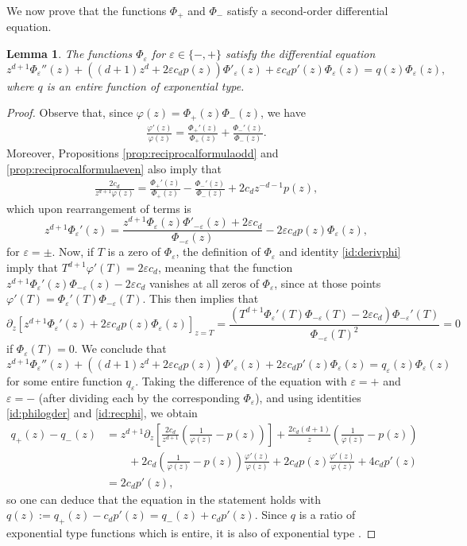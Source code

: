 \documentclass[a4paper,reqno,12pt]{amsart}
\newtheorem{lemma}[theorem]{Lemma}
\renewcommand{\P}{\Phi}
\newcommand{\ep}{\varepsilon}
\newcommand{\p}{\varphi}
\begin{document}
We now prove that the functions $\P_{+}$ and $\P_{-}$ satisfy a second-order differential equation.

\begin{lemma}\label{lem:ode-bigP}
The functions $\P_\ep$ for $\ep \in \{- ,+\}$ satisfy the differential equation
$$
z^{d+1}\P_\ep''(z) + ((d+1)z^d+2\ep c_d p(z))\P'_\ep(z) + \ep c_d p'(z) \P_\ep(z) = q(z) \P_\ep(z),
$$
where $q$ is an entire function of exponential type.
\end{lemma}
\begin{proof}
Observe that, since $\p(z)=\Phi_+(z)\Phi_-(z)$, we have 
\begin{align}\label{id:philogder}
\frac{\p'(z)}{\p(z)}=\frac{\P_+'(z)}{\P_+(z)}+\frac{\P_-'(z)}{\P_-(z)}.
\end{align}
Moreover, Propositions \ref{prop:reciprocalformulaodd} and \ref{prop:reciprocalformulaeven} also imply that
\begin{align}\label{id:recphi}
   \frac{2c_d}{z^{d+1}\p(z)} = \frac{\P_+'(z)}{\P_+(z)}-\frac{\P_-'(z)}{\P_-(z)} +2c_d z^{-d-1}p(z),
\end{align}
which upon rearrangement of terms is
$$
z^{d+1}\P_\ep'(z) = \frac{z^{d+1}\P_\ep(z)\P'_{-\ep}(z) +2\ep c_d}{\P_{-\ep}(z)} -2\ep c_d p(z)\P_\ep(z),
$$
for $\ep=\pm $. Now, if $T$ is a zero of $\P_\ep$, the definition of $\P_\ep$ and identity \eqref{id:derivphi} imply that $T^{d+1} \p'(T) = 2 \ep c_d$, meaning that the function $z^{d+1} \P_\ep'(z)\P_{-\ep}(z)-2\ep c_d$ vanishes at all zeros of $\P_\ep$, since at those points $\p'(T)  = \P_\ep'(T )\P_{-\ep} (T)$. This then implies that
$$
\partial_z [z^{d+1}\P_\ep'(z) + 2 \ep c_d p(z) \P_\ep(z)]_{z=T} = \frac{(T^{d+1}\P_\ep'(T)\P_{-\ep}(T) -2\ep c_d)\P_{-\ep}'(T)}{\P_{-\ep}(T)^2} = 0
$$
if $\P_\ep(T)=0$. We conclude that
$$
z^{d+1}\P_\ep''(z) + ((d+1)z^d+2\ep c_d p(z))\P'_\ep(z) + 2\ep c_d p'(z) \P_\ep(z) = q_\ep(z) \P_\ep(z)
$$
for some entire function $q_\ep$. Taking the difference of the equation with $\ep=+$ and $\ep=-$ (after dividing each by the corresponding $\P_\ep$), and using identities \eqref{id:philogder} and \eqref{id:recphi}, we obtain 
\begin{align*}
q_+(z)-q_-(z)&=
z^{d+1}\partial_z\left[
\frac{2c_d}{z^{d+1}}
\left(\frac{1}{\varphi(z)}-p(z)\right)\right]
+\frac{2c_d(d+1)}{z}\left(\frac{1}{\varphi(z)}-p(z)\right) \\
&\qquad+2c_d\left(\frac{1}{\varphi(z)}-p(z)\right)\frac{\varphi'(z)}{\varphi(z)}
+2c_d p(z)\frac{\varphi'(z)}{\varphi(z)}+4c_dp'(z)\\
&= 2c_d p'(z),
\end{align*}
so one can deduce that the equation in the statement holds with $q(z) := q_+(z) - c_d p'(z)=q_-(z) + c_d p'(z)$. Since $q$ is a ratio of exponential type functions which is entire, it is also of exponential type \cite[p. 22]{K}.
\end{proof}
\end{document}
